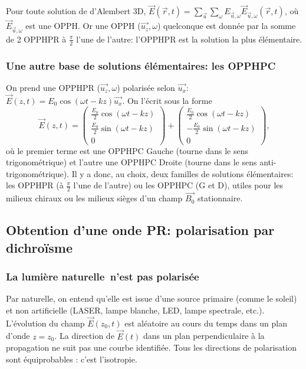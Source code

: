 Pour toute solution de d'Alembert 3D, $\vec{E}(\vec{r},t)=\sum\limits_{\vec{u}}\sum\limits_{\omega}E_{\vec{u},\omega}\vec{E}_{\vec{u},\omega}(\vec{r},t)$, où $\vec{E}_{\vec{u},\omega}$ est une OPPH. Or une OPPH ($\vec{u_z},\omega$) quelconque est donnée par la somme de 2 OPPHPR à $\frac{\pi}{2}$ l'une de l'autre: l'OPPHPR est la solution la plus élémentaire.

\subsubsection{Une autre base de solutions élémentaires: les OPPHPC}
On prend une OPPHPR ($\vec{u_z},\omega$) polarisée selon $\vec{u_x}$: $\vec{E}(z,t)=E_0\cos(\omega t-kz)\vec{u_x}$. On l'écrit sous la forme
\begin{equation*}
    \vec{E}(z,t)=\begin{pmatrix}
        \frac{E_0}{2}\cos(\omega t-kz)\\
        \frac{E_0}{2}\sin(\omega t-kz)\\0
    \end{pmatrix}+\begin{pmatrix}
        \frac{E_0}{2}\cos(\omega t-kz)\\
        -\frac{E_0}{2}\sin(\omega t-kz)\\0
    \end{pmatrix},
\end{equation*}
où le premier terme est une OPPHPC Gauche (tourne dans le sens trigonométrique) et l'autre une OPPHPC Droite (tourne dans le sens anti-trigonométrique). Il y a donc, au choix, deux familles de solutions élémentaires: les OPPHPR (à $\frac{\pi}{2}$ l'une de l'autre) ou les OPPHPC (G et D), utiles pour les milieux chiraux ou les milieux sièges d'un champ $\vec{B_0}$ stationnaire.

\subsection{Obtention d'une onde PR: polarisation par dichroïsme}
\subsubsection{La lumière \og naturelle\fg~n'est pas polarisée}

Par \og naturelle\fg, on entend qu'elle est issue d'une source primaire (comme le soleil) et non artificielle (LASER, lampe blanche, LED, lampe spectrale, etc.). L'évolution du champ $\vec{E}(z_0,t)$ est aléatoire au cours du temps dans un plan d'onde $z=z_0$. La direction de $\vec{E}(t)$ dans un plan perpendiculaire à la propagation ne suit pas une courbe identifiée. Tous les directions de polarisation sont équiprobables : c'est l'isotropie.

